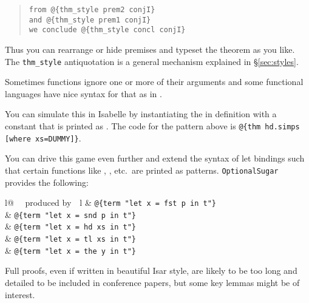 \begin{isabellebody}
\begin{isamarkuptext}
\begin{quote}
\verb!from !\verb!@!\verb!{thm_style prem2 conjI}!\\
\verb!and !\verb!@!\verb!{thm_style prem1 conjI}!\\
\verb!we conclude !\verb!@!\verb!{thm_style concl conjI}!
\end{quote}
Thus you can rearrange or hide premises and typeset the theorem as you like.
The \verb!thm_style! antiquotation is a general mechanism explained
in \S\ref{sec:styles}.%
\end{isamarkuptext}%
\isamarkuptrue%
%
\isamarkuptrue%
%
\begin{isamarkuptext}%
Sometimes functions ignore one or more of their
  arguments and some functional languages have nice 
  syntax for that as in .

  You can simulate this in Isabelle by instantiating the  in
  definition \mbox{} with a constant  that
  is printed as \isa{\_}. The code for the pattern above is 
  \verb!@!\verb!{thm hd.simps [where xs=DUMMY]}!.

  You can drive this game even further and extend the syntax of let
  bindings such that certain functions like , , 
  etc.\ are printed as patterns. \texttt{OptionalSugar} provides the
  following:
  
  \begin{center}
  \begin{tabular}{l@ {~~produced by~~}l}
   & \verb!@!\verb!{term "let x = fst p in t"}!\\
   & \verb!@!\verb!{term "let x = snd p in t"}!\\
   & \verb!@!\verb!{term "let x = hd xs in t"}!\\
   & \verb!@!\verb!{term "let x = tl xs in t"}!\\
   & \verb!@!\verb!{term "let x = the y in t"}!\\
  \end{tabular}
  \end{center}%
\end{isamarkuptext}%
\isamarkuptrue%
%
\isamarkuptrue%
%
\begin{isamarkuptext}%
Full proofs, even if written in beautiful Isar style, are likely to
  be too long and detailed to be included in conference papers, but
  some key lemmas might be of interest.


\end{isamarkuptext}
\end{isabellebody}
